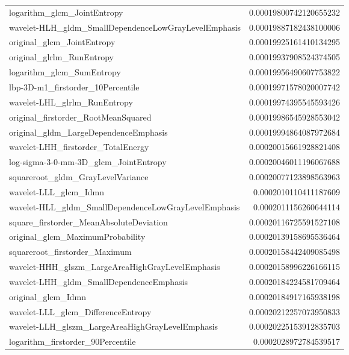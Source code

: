 {\begin{xltabular}[H]{\textwidth}{X r}
        logarithm\_glcm\_JointEntropy & 0.00019800742120655232 \\
        wavelet-HLH\_gldm\_SmallDependenceLowGrayLevelEmphasis & 0.00019887182438100006 \\
        original\_glcm\_JointEntropy & 0.00019925161410134295 \\
        original\_glrlm\_RunEntropy & 0.00019937908524374505 \\
        logarithm\_glcm\_SumEntropy & 0.00019956490607753822 \\
        lbp-3D-m1\_firstorder\_10Percentile & 0.00019971578020007742 \\
        wavelet-LHL\_glrlm\_RunEntropy & 0.00019974395545593426 \\
        original\_firstorder\_RootMeanSquared & 0.00019986545928553042 \\
        original\_gldm\_LargeDependenceEmphasis & 0.00019994864087972684 \\
        wavelet-LHH\_firstorder\_TotalEnergy & 0.00020015661928821408 \\
        log-sigma-3-0-mm-3D\_glcm\_JointEntropy & 0.00020046011196067688 \\
        squareroot\_gldm\_GrayLevelVariance & 0.00020077123898563963 \\
        wavelet-LLL\_glcm\_Idmn & 0.0002010110411187609 \\
        wavelet-HLL\_gldm\_SmallDependenceLowGrayLevelEmphasis & 0.0002011156260644114 \\
        square\_firstorder\_MeanAbsoluteDeviation & 0.00020116725591527108 \\
        original\_glcm\_MaximumProbability & 0.00020139158695536464 \\
        squareroot\_firstorder\_Maximum & 0.00020158442409085498 \\
        wavelet-HHH\_glszm\_LargeAreaHighGrayLevelEmphasis & 0.00020158996226166115 \\
        wavelet-LHH\_gldm\_SmallDependenceEmphasis & 0.00020184224581709464 \\
        original\_glcm\_Idmn & 0.00020184917165938198 \\
        wavelet-LLL\_glcm\_DifferenceEntropy & 0.00020212257073950833 \\
        wavelet-LLH\_glszm\_LargeAreaHighGrayLevelEmphasis & 0.00020225153912835703 \\
        logarithm\_firstorder\_90Percentile & 0.0002028972784539517 \\

\end{xltabular}}
